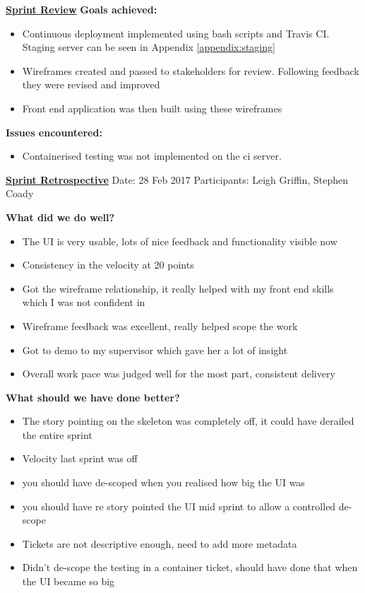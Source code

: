 \underline{\textbf{Sprint Review}}\newline
\textbf{Goals achieved:}
\begin{itemize}
	\item Continuous deployment implemented using bash scripts and Travis CI. Staging server can be seen in Appendix \ref{appendix:staging}
	\item Wireframes created and passed to stakeholders for review. Following feedback they were revised and improved
	\item Front end application was then built using these wireframes
\end{itemize}

\textbf{Issues encountered:}
\begin{itemize}
	\item Containerised testing was not implemented on the \gls{ci} server.
\end{itemize}

\underline{\textbf{Sprint Retrospective}}\newline
Date: 28 Feb 2017\newline
Participants: Leigh Griffin, Stephen Coady

\textbf{What did we do well?}
\begin{itemize}
	\item The UI is very usable, lots of nice feedback and functionality visible now
	\item Consistency in the velocity at 20 points
	\item Got the wireframe relationship, it really helped with my front end skills which I was not confident in
	\item Wireframe feedback was excellent, really helped scope the work
	\item Got to demo to my supervisor which gave her a lot of insight
	\item Overall work pace was judged well for the most part, consistent delivery
\end{itemize}
\textbf{What should we have done better?}
\begin{itemize}
	\item The story pointing on the skeleton was completely off, it could have derailed the entire sprint
	\item Velocity last sprint was off 
	\item you should have de-scoped when you realised how big the UI was
	\item you should have re story pointed the UI mid sprint to allow a controlled de-scope
	\item Tickets are not descriptive enough, need to add more metadata
	\item Didn't de-scope the testing in a container ticket, should have done that when the UI became so big
\end{itemize}

